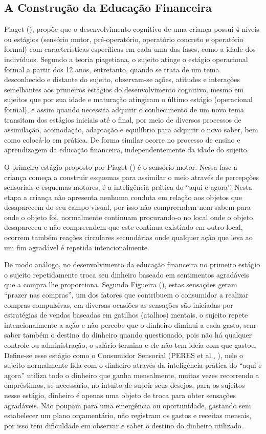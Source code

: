 \subsection{A Construção da Educação Financeira}
Piaget (\citeyear{piaget1971}), propõe que o desenvolvimento cognitivo de uma criança possui 4 níveis ou estágios (sensório motor, pré-operatório, operatório concreto e operatório formal) com características específicas em cada uma das fases, como a idade dos indivíduos. Segundo a teoria piagetiana, o sujeito atinge o estágio operacional formal a partir dos 12 anos, entretanto, quando se trata de um tema desconhecido e distante do sujeito, observam-se ações, atitudes e interações semelhantes aos primeiros estágios do desenvolvimento cognitivo, mesmo em sujeitos que por sua idade e maturação atingiram o último estágio (operacional formal), e assim quando necessita adquirir o conhecimento de um novo tema transitam dos estágios iniciais até o final, por meio de diversos processos de assimilação, acomodação, adaptação e equilíbrio para adquirir o novo saber, bem como colocá-lo em prática. De forma similar ocorre no processo de ensino e aprendizagem da educação financeira, independentemente da idade do sujeito.

O primeiro estágio proposto por Piaget (\citeyear{piaget1971}) é o sensório motor. Nessa fase a criança começa a construir esquemas para assimilar o meio através de percepções sensoriais e esquemas motores, é a inteligência prática do “aqui e agora”. Nesta etapa a criança não apresenta nenhuma conduta em relação aos objetos que desaparecem do seu campo visual, por isso não compreendem nem sabem para onde o objeto foi, normalmente continuam procurando-o no local onde o objeto desapareceu e não compreendem que este continua existindo em outro local, ocorrem também reações circulares secundárias onde qualquer ação que leva ao um fim agradável é repetida intencionalmente.

De modo análogo, no desenvolvimento da educação financeira no primeiro estágio o sujeito repetidamente troca seu dinheiro baseado em sentimentos agradáveis que a compra lhe proporciona. Segundo Figueira (\citeyear{figueira2014}), estas sensações geram “prazer nas compras”, um dos fatores que contribuem o consumidor a realizar compras compulsivas, em diversas ocasiões as sensações são iniciadas por estratégias de vendas baseadas em gatilhos (atalhos) mentais, o sujeito repete intencionalmente a ação e não percebe que o dinheiro diminui a cada gasto, sem saber também o destino do dinheiro quando questionado, pois não há qualquer controle ou administração, o salário termina e ele não tem ideia com que gastou. Define-se esse estágio como o Consumidor Sensorial (PERES et al., \citeyear{peres2019}), nele o sujeito normalmente lida com o dinheiro através da inteligência prática do “aqui e agora” utiliza todo o dinheiro que ganha mensalmente, muitas vezes recorrendo a empréstimos, se necessário, no intuito de suprir seus desejos, para os sujeitos nesse estágio, dinheiro é apenas uma objeto de troca para obter sensações agradáveis. Não poupam para uma emergência ou oportunidade, gastando sem estabelecer um plano orçamentário, não registram os gastos e receitas mensais, por isso tem dificuldade em observar e saber o destino do dinheiro utilizado.

